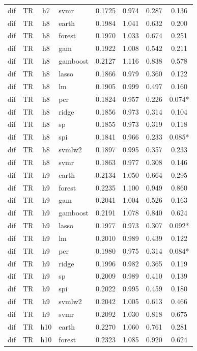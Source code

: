 \begin{ThreePartTable}
\begin{longtable}[t]{llclcccc}
dif & TR & h7 & svmr & 0.1725 & 0.974 & 0.287 & 0.136\\
\addlinespace
dif & TR & h8 & earth & 0.1984 & 1.041 & 0.632 & 0.200\\
dif & TR & h8 & forest & 0.1970 & 1.033 & 0.674 & 0.251\\
dif & TR & h8 & gam & 0.1922 & 1.008 & 0.542 & 0.211\\
dif & TR & h8 & gamboost & 0.2127 & 1.116 & 0.838 & 0.578\\
dif & TR & h8 & lasso & 0.1866 & 0.979 & 0.360 & 0.122\\
dif & TR & h8 & lm & 0.1905 & 0.999 & 0.497 & 0.160\\
dif & TR & h8 & pcr & 0.1824 & 0.957 & 0.226 & 0.074*\\
dif & TR & h8 & ridge & 0.1856 & 0.973 & 0.314 & 0.104\\
dif & TR & h8 & sp & 0.1855 & 0.973 & 0.319 & 0.118\\
dif & TR & h8 & spi & 0.1841 & 0.966 & 0.233 & 0.085*\\
dif & TR & h8 & svmlw2 & 0.1897 & 0.995 & 0.357 & 0.233\\
dif & TR & h8 & svmr & 0.1863 & 0.977 & 0.308 & 0.146\\
\addlinespace
dif & TR & h9 & earth & 0.2134 & 1.050 & 0.664 & 0.295\\
dif & TR & h9 & forest & 0.2235 & 1.100 & 0.949 & 0.860\\
dif & TR & h9 & gam & 0.2041 & 1.004 & 0.526 & 0.163\\
dif & TR & h9 & gamboost & 0.2191 & 1.078 & 0.840 & 0.624\\
dif & TR & h9 & lasso & 0.1977 & 0.973 & 0.307 & 0.092*\\
dif & TR & h9 & lm & 0.2010 & 0.989 & 0.439 & 0.122\\
dif & TR & h9 & pcr & 0.1980 & 0.975 & 0.314 & 0.084*\\
dif & TR & h9 & ridge & 0.1996 & 0.982 & 0.365 & 0.119\\
dif & TR & h9 & sp & 0.2009 & 0.989 & 0.410 & 0.139\\
dif & TR & h9 & spi & 0.2022 & 0.995 & 0.459 & 0.180\\
dif & TR & h9 & svmlw2 & 0.2042 & 1.005 & 0.613 & 0.466\\
dif & TR & h9 & svmr & 0.2092 & 1.030 & 0.818 & 0.675\\
\addlinespace
dif & TR & h10 & earth & 0.2270 & 1.060 & 0.761 & 0.281\\
dif & TR & h10 & forest & 0.2323 & 1.085 & 0.920 & 0.624\\

\end{longtable}
\end{ThreePartTable}
